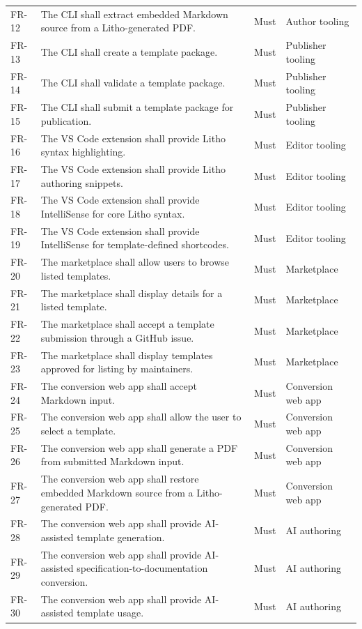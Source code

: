 \begin{xltabular}{\textwidth}{@{}p{0.12\textwidth}X p{0.15\textwidth}p{0.20\textwidth}@{}}
FR-12 & The CLI shall extract embedded Markdown source from a Litho-generated PDF. & Must & Author tooling \\
FR-13 & The CLI shall create a template package. & Must & Publisher tooling \\
FR-14 & The CLI shall validate a template package. & Must & Publisher tooling \\
FR-15 & The CLI shall submit a template package for publication. & Must & Publisher tooling \\
FR-16 & The VS Code extension shall provide Litho syntax highlighting. & Must & Editor tooling \\
FR-17 & The VS Code extension shall provide Litho authoring snippets. & Must & Editor tooling \\
FR-18 & The VS Code extension shall provide IntelliSense for core Litho syntax. & Must & Editor tooling \\
FR-19 & The VS Code extension shall provide IntelliSense for template-defined shortcodes. & Must & Editor tooling \\
FR-20 & The marketplace shall allow users to browse listed templates. & Must & Marketplace \\
FR-21 & The marketplace shall display details for a listed template. & Must & Marketplace \\
FR-22 & The marketplace shall accept a template submission through a GitHub issue. & Must & Marketplace \\
FR-23 & The marketplace shall display templates approved for listing by maintainers. & Must & Marketplace \\
FR-24 & The conversion web app shall accept Markdown input. & Must & Conversion web app \\
FR-25 & The conversion web app shall allow the user to select a template. & Must & Conversion web app \\
FR-26 & The conversion web app shall generate a PDF from submitted Markdown input. & Must & Conversion web app \\
FR-27 & The conversion web app shall restore embedded Markdown source from a Litho-generated PDF. & Must & Conversion web app \\
FR-28 & The conversion web app shall provide AI-assisted template generation. & Must & AI authoring \\
FR-29 & The conversion web app shall provide AI-assisted specification-to-documentation conversion. & Must & AI authoring \\
FR-30 & The conversion web app shall provide AI-assisted template usage. & Must & AI authoring \\

\end{xltabular}
